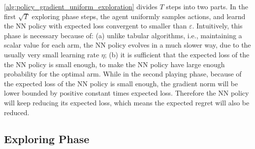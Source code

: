 \cref{alg:policy_gradient_uniform_exploration} divides $T$ steps into two parts. In the first $\sqrt{T}$ exploring phase steps, the agent uniformly samples actions, and learnd the NN policy with expected loss convergent to smaller than $\varepsilon$. Intuitively, this phase is necessary because of: (a) unlike tabular algorithms, i.e., maintaining a scalar value for each arm, the NN policy evolves in a much slower way, due to the usually very small learning rate $\eta$; (b) it is sufficient that the expected loss of the the NN policy is small enough, to make the NN policy have large enough probability for the optimal arm. While in the second playing phase, because of the expected loss of the NN policy is small enough, the gradient norm will be lower bounded by positive constant times expected loss. Therefore the NN policy will keep reducing its expected loss, which means the expected regret will also be reduced.

\subsection{Exploring Phase}
\label{subsec:exploring_phase}

